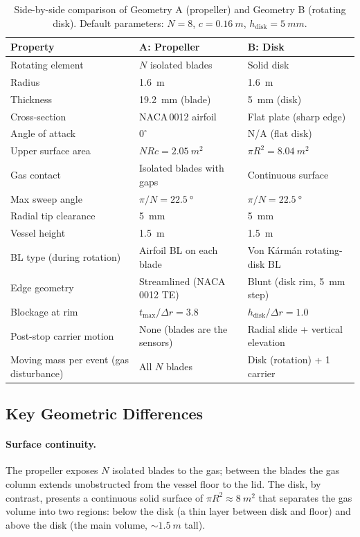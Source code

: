 \documentclass[11pt,a4paper]{article}
\begin{document}
\begin{table}[H]
\centering
\caption{Side-by-side comparison of Geometry A (propeller) and
Geometry B (rotating disk). Default parameters: $N = 8$,
$c = \SI{0.16}{m}$, $h_\mathrm{disk} = \SI{5}{mm}$.}
\label{tab:comparison}
\begin{tabular}{lll}
\toprule
Property & A: Propeller & B: Disk \\
\midrule
Rotating element
  & $N$ isolated blades
  & Solid disk \\
Radius
  & \SI{1.6}{m}
  & \SI{1.6}{m} \\
Thickness
  & \SI{19.2}{mm} (blade)
  & \SI{5}{mm} (disk) \\
Cross-section
  & NACA\,0012 airfoil
  & Flat plate (sharp edge) \\
Angle of attack
  & $0^\circ$
  & N/A (flat disk) \\
Upper surface area
  & $N R c = \SI{2.05}{m^2}$
  & $\pi R^2 = \SI{8.04}{m^2}$ \\
Gas contact
  & Isolated blades with gaps
  & Continuous surface \\
Max sweep angle
  & $\pi/N = \SI{22.5}{\degree}$
  & $\pi/N = \SI{22.5}{\degree}$ \\
Radial tip clearance
  & \SI{5}{mm}
  & \SI{5}{mm} \\
Vessel height
  & \SI{1.5}{m}
  & \SI{1.5}{m} \\
BL type (during rotation)
  & Airfoil BL on each blade
  & Von K\'arm\'an rotating-disk BL \\
Edge geometry
  & Streamlined (NACA\,0012 TE)
  & Blunt (disk rim, \SI{5}{mm} step) \\
Blockage at rim
  & $t_\mathrm{max}/\Delta r = 3.8$
  & $h_\mathrm{disk}/\Delta r = 1.0$ \\
Post-stop carrier motion
  & None (blades are the sensors)
  & Radial slide + vertical elevation \\
Moving mass per event (gas disturbance)
  & All $N$ blades
  & Disk (rotation) + 1 carrier \\
\bottomrule
\end{tabular}
\end{table}

\subsection{Key Geometric Differences}

\paragraph{Surface continuity.}
The propeller exposes $N$ isolated blades to the gas; between the
blades the gas column extends unobstructed from the vessel floor to
the lid. The disk, by contrast, presents a continuous solid surface of
$\pi R^2 \approx \SI{8}{m^2}$ that separates the gas volume into two
regions: below the disk (a thin layer between disk and floor) and above
the disk (the main volume, $\sim\SI{1.5}{m}$ tall).
\end{document}

